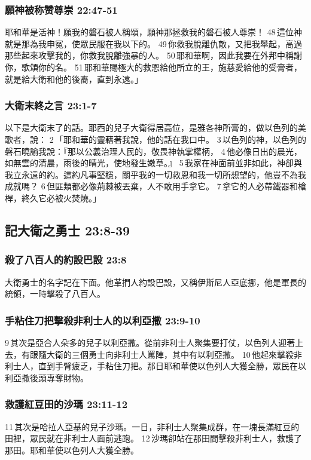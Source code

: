 \subsubsection{願神被称赞尊崇 22:47-51}
耶和華是活神！願我的磐石被人稱頌，願神那拯救我的磐石被人尊崇！ 48 這位神就是那為我申冤，使眾民服在我以下的。 49 你救我脫離仇敵，又把我舉起，高過那些起來攻擊我的，你救我脫離強暴的人。 50 耶和華啊，因此我要在外邦中稱謝你，歌頌你的名。 51 耶和華賜極大的救恩給他所立的王，施慈愛給他的受膏者，就是給大衛和他的後裔，直到永遠。」

\subsubsection{大衛末終之言 23:1-7}
以下是大衛末了的話。耶西的兒子大衛得居高位，是雅各神所膏的，做以色列的美歌者，說： 2 「耶和華的靈藉著我說，他的話在我口中。 3 以色列的神，以色列的磐石曉諭我說：『那以公義治理人民的，敬畏神執掌權柄， 4 他必像日出的晨光，如無雲的清晨，雨後的晴光，使地發生嫩草。』 5 我家在神面前並非如此，神卻與我立永遠的約。這約凡事堅穩，關乎我的一切救恩和我一切所想望的，他豈不為我成就嗎？ 6 但匪類都必像荊棘被丟棄，人不敢用手拿它。 7 拿它的人必帶鐵器和槍桿，終久它必被火焚燒。」

\subsection{記大衛之勇士 23:8-39}
\subsubsection{殺了八百人的約設巴設 23:8}
大衛勇士的名字記在下面。他革捫人約設巴設，又稱伊斯尼人亞底挪，他是軍長的統領，一時擊殺了八百人。
\subsubsection{手粘住刀把擊殺非利士人的以利亞撒 23:9-10}
9 其次是亞合人朵多的兒子以利亞撒。從前非利士人聚集要打仗，以色列人迎著上去，有跟隨大衛的三個勇士向非利士人罵陣，其中有以利亞撒。 10 他起來擊殺非利士人，直到手臂疲乏，手粘住刀把。那日耶和華使以色列人大獲全勝，眾民在以利亞撒後頭專奪財物。

\subsubsection{救護紅豆田的沙瑪 23:11-12}
11 其次是哈拉人亞基的兒子沙瑪。一日，非利士人聚集成群，在一塊長滿紅豆的田裡，眾民就在非利士人面前逃跑。 12 沙瑪卻站在那田間擊殺非利士人，救護了那田。耶和華使以色列人大獲全勝。
